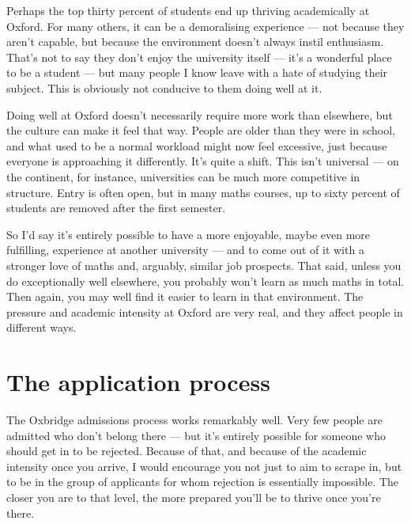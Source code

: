 \documentclass[11pt]{article}
\newif\ifshowcomments
\newif\ifshowpersonal
\newcommand{\comment}[1]{\ifshowcomments\textcolor{myblue}{\textbf{#1}}\fi}
\newcommand{\personal}[1]{\ifshowpersonal\textcolor{myorange}{\emph{#1}}\fi}
\begin{document}
\personal{Personally, I probably didn't. However I did always try to read widely around the subject.}

Perhaps the top thirty percent of students end up thriving academically at Oxford. For many others, it can be a demoralising experience — not because they aren’t capable, but because the environment doesn’t always instil enthusiasm. That’s not to say they don’t enjoy the university itself — it’s a wonderful place to be a student — but many people I know leave with a hate of studying their subject. This is obviously not conducive to them doing well at it.

Doing well at Oxford doesn’t necessarily require more work than elsewhere, but the culture can make it feel that way. People are older than they were in school, and what used to be a normal workload might now feel excessive, just because everyone is approaching it differently. It’s quite a shift. This isn’t universal — on the continent, for instance, universities can be much more competitive in structure. Entry is often open, but in many maths courses, up to sixty percent of students are removed after the first semester.

So I’d say it’s entirely possible to have a more enjoyable, maybe even more fulfilling, experience at another university — and to come out of it with a stronger love of maths and, arguably, similar job prospects. That said, unless you do exceptionally well elsewhere, you probably won’t learn as much maths in total. Then again, you may well find it easier to learn in that environment. The pressure and academic intensity at Oxford are very real, and they affect people in different ways.

\comment{From what I've seen of you, Jack, you absolutely have the curiosity and ability that Oxbridge looks for. I wouldn’t worry about whether you’re the right fit — you are. It’ll just be a matter of keeping a focus on your studies while you're there.}

\section{The application process}

The Oxbridge admissions process works remarkably well. Very few people are admitted who don’t belong there — but it’s entirely possible for someone who should get in to be rejected. Because of that, and because of the academic intensity once you arrive, I would encourage you not just to aim to scrape in, but to be in the group of applicants for whom rejection is essentially impossible. The closer you are to that level, the more prepared you’ll be to thrive once you’re there.
\end{document}
